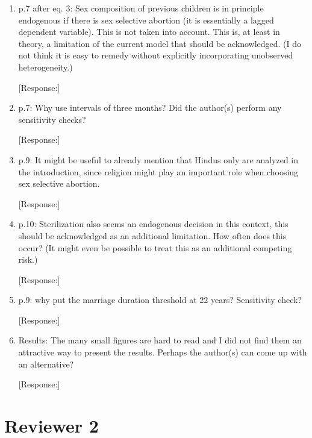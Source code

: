 \documentclass[letterpaper,12pt]{article}
\begin{document}
\begin{enumerate}
[Response:]



\item p.7 after eq. 3: Sex composition of previous children is in
principle endogenous  if there is sex selective abortion (it is
essentially a lagged dependent variable). This is not taken into
account. This is, at least in theory, a limitation of the current model
that should be acknowledged. (I do not think it is easy to remedy
without explicitly incorporating unobserved heterogeneity.)

[Response:]




\item p.7: Why use intervals of three months? Did the author(s) perform
any sensitivity checks? 

[Response:]




\item p.9: It might be useful to already mention that Hindus only are
analyzed in the introduction, since religion might play an important
role when choosing sex selective abortion.

[Response:]




\item p.10: Sterilization also seems an endogenous decision in this
context, this should be acknowledged as an additional limitation. How
often does this occur? (It might even be possible to treat this as an
additional competing risk.)

[Response:]




\item p.9: why put the marriage duration threshold at 22 years?
Sensitivity check?

[Response:]



\item Results: The many small figures are hard to read and I did not
find them an attractive way to present the results. Perhaps the
author(s) can come up with an alternative?

[Response:]




\end{enumerate}

\newpage

\section*{Reviewer 2}
\end{document}
